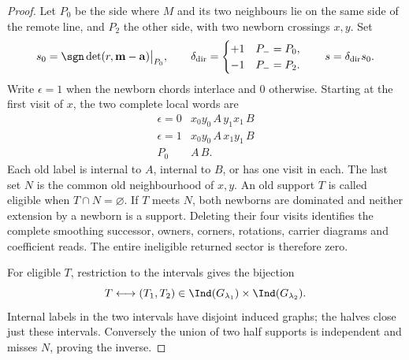 \begin{proof}
Let $P_0$ be the side where $M$ and its two neighbours lie on the same
side of the remote line, and $P_2$ the other side, with two newborn
crossings $x,y$.  Set
\begin{equation}\label{s7c:bigon-signs}
 s_0=\sgn\det(r,\mathbf m-\mathbf a)\big|_{P_0},\qquad
 \delta_{\rm dir}=\begin{cases}+1&P_- =P_0,\\-1&P_-=P_2.
 \end{cases}
 \qquad s=\delta_{\rm dir}s_0.
\end{equation}
Write $\epsilon=1$ when the newborn chords interlace and $0$ otherwise.
Starting at the first visit of $x$, the two complete local words are
\begin{equation}\label{s7c:bigon-words-eq}
 \begin{array}{c|l}
 \epsilon=0&x_0y_0\,A\,y_1x_1\,B\\
 \epsilon=1&x_0y_0\,A\,x_1y_1\,B\\
 P_0&A\,B.
 \end{array}
\end{equation}
Each old label is internal to $A$, internal to $B$, or has one visit in
each.  The last set $N$ is the common old neighbourhood of $x,y$.
An old support $T$ is called eligible when $T\cap N=\varnothing$.
If $T$ meets $N$, both newborns are dominated and neither extension
by a newborn is a support.  Deleting their four visits identifies the
complete smoothing successor, owners, corners, rotations, carrier
diagrams and coefficient reads.  The entire ineligible returned sector
is therefore zero.

For eligible $T$, restriction to the intervals gives the bijection
\begin{equation}\label{s7c:eligible-bijection}
 T\longleftrightarrow(T_1,T_2)\in
 \Ind(G_{\lambda_1})\times\Ind(G_{\lambda_2}).
\end{equation}
Internal labels in the two intervals have disjoint induced graphs;
the halves close just these intervals.  Conversely the union of two
half supports is independent and misses $N$, proving the inverse.


\end{proof}
